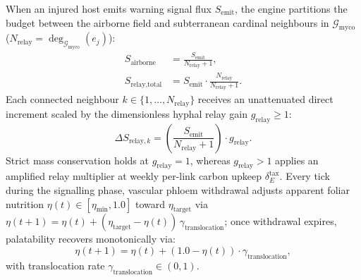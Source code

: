 When an injured host emits warning signal flux $S_{\text{emit}}$, the engine partitions the budget between the airborne field and subterranean cardinal neighbours in $\mathcal{G}_{\text{myco}}$ ($N_{\text{relay}} = \deg_{\mathcal{G}_{\text{myco}}}(e_j)$):
\begin{align}
  S_{\text{airborne}} &= \frac{S_{\text{emit}}}{N_{\text{relay}} + 1}, \label{eq:myco_airborne} \\
  S_{\text{relay,total}} &= S_{\text{emit}} \cdot \frac{N_{\text{relay}}}{N_{\text{relay}} + 1}. \label{eq:myco_subterranean}
\end{align}
Each connected neighbour $k \in \{1, \dots, N_{\text{relay}}\}$ receives an unattenuated direct increment scaled by the dimensionless hyphal relay gain $g_{\text{relay}} \ge 1$:
\begin{equation}
  \Delta S_{\text{relay}, k} = \left( \frac{S_{\text{emit}}}{N_{\text{relay}} + 1} \right) \cdot g_{\text{relay}}.
  \label{eq:myco_neighbor_flux}
\end{equation}
Strict mass conservation holds at $g_{\text{relay}} = 1$, whereas $g_{\text{relay}} > 1$ applies an amplified relay multiplier at weekly per-link carbon upkeep $\delta_E^{\text{tax}}$. Every tick during the signalling phase, vascular phloem withdrawal adjusts apparent foliar nutrition $\eta(t) \in [\eta_{\min}, 1.0]$ toward $\eta_{\text{target}}$ via $\eta(t+1) = \eta(t) + (\eta_{\text{target}} - \eta(t))\,\gamma_{\text{translocation}}$; once withdrawal expires, palatability recovers monotonically via:
\begin{equation}
  \eta(t+1) = \eta(t) + \left( 1.0 - \eta(t) \right) \cdot \gamma_{\text{translocation}},
  \label{eq:phloem_recovery_recurrence}
\end{equation}
with translocation rate $\gamma_{\text{translocation}} \in (0, 1)$.

